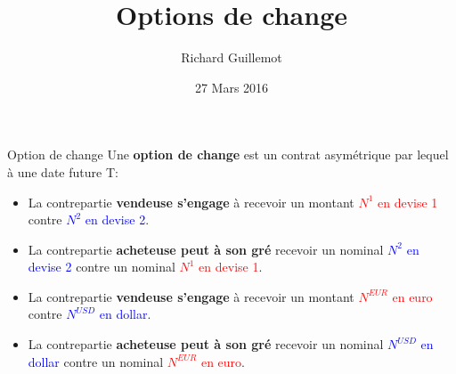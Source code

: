 \documentclass{beamer}
\title[Produits dérivés de change et de credit]{Options de change}
\author{Richard Guillemot}
\institute{DIFIQ}
\date{27 Mars 2016}
\begin{document}
\begin{frame}
\titlepage
\end{frame}

\begin{frame}{Option de change}
Une \textbf{option de change} est un contrat asymétrique par lequel à une date future T:\\
\vspace{0.5cm}
\begin{overprint}
\begin{itemize}
\item La contrepartie \textbf{vendeuse s'engage} à recevoir un montant \textcolor{red}{$N^1$ en devise 1} contre \textcolor{blue}{$N^2$ en devise 2}.
\item La contrepartie \textbf{acheteuse peut à son gré} recevoir un nominal \textcolor{blue}{$N^2$ en devise 2} contre un nominal \textcolor{red}{$N^1$ en devise 1}.
\end{itemize}
\begin{itemize}
\item La contrepartie \textbf{vendeuse s'engage} à recevoir un montant \textcolor{red}{$N^{EUR}$ en euro} contre \textcolor{blue}{$N^{USD}$ en dollar}.
\item La contrepartie \textbf{acheteuse peut à son gré} recevoir un nominal \textcolor{blue}{$N^{USD}$ en dollar} contre un nominal \textcolor{red}{$N^{EUR}$ en euro}.
\end{itemize}
\end{overprint}
\end{frame}
\end{document}
